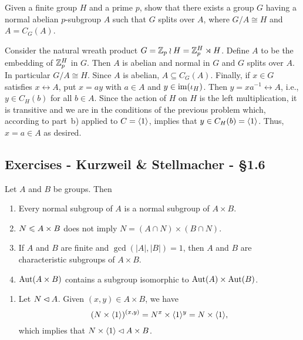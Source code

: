 \begin{solution}
\begin{probl}
    Given a finite group\/ $H$ and a prime\/ $p$, show that there exists a group\/ $G$ having a normal abelian\/ $p$-subgroup\/ $A$ such that\/ $G$ splits over\/ $A$, where\/ $G/A \cong H$ and\/ $A = C_G(A)$.
\end{probl}

\begin{solution} Consider the natural wreath product $G=\mathbb{Z}_p\wr H=\mathbb{Z}_p^H\rtimes H$. Define $A$ to be the embedding of $\mathbb{Z}_p^H$ in $G$. Then $A$ is abelian and normal in $G$ and $G$ splits over $A$. In particular $G/A\cong H$. Since $A$ is abelian, $A\subseteq C_G(A)$. Finally, if $x\in G$ satisfies $x\leftrightarrow A$, put $x=ay$ with $a\in A$ and $y\in\operatorname{im}(\iota_H)$. Then $y=xa^{-1}\leftrightarrow A$, i.e., $y\in C_H(b)$ for all $b\in A$. Since the action of $H$ on $H$ is the left multiplication, it is transitive and we are in the conditions of the previous problem which, according to part~b) applied to $C=\langle1\rangle$, implies that $y\in C_H(b)=\langle1\rangle$. Thus, $x=a\in A$ as desired.  \end{solution}

\subsection{Exercises - Kurzweil \& Stellmacher - \S 1.6}

\begin{exr}Let\/ $A$ and $B$ be groups. Then
    \begin{enumerate}[\rm a)]
    \item Every normal subgroup of\/ $A$ is a normal subgroup of\/ $A \times B$.
    \item $N \leqslant A \times B$ does not imply\/ $N = (A \cap N) \times (B \cap N)$.
    \item If\/ $A$ and\/ $B$ are finite and\/ $\gcd(|A|, |B|) = 1$, then\/ $A$ and\/ $B$ are characteristic subgroups of\/ $A \times B$.
    \item ${\rm Aut}(A \times B)$ contains a subgroup isomorphic to\/ ${\rm Aut}(A) \times {\rm Aut}(B)$.
    \end{enumerate}
\end{exr}

\begin{solution}

\begin{enumerate}[\rm a)]
    \item Let $N\lhd A$. Given $(x,y)\in A\times B$, we have
    $$
        (N\times\langle1\rangle)^{(x,y)}=N^x\times\langle1\rangle^y = N\times\langle1\rangle,
    $$
    which implies that $N\times\langle1\rangle\lhd A\times B$.


\end{enumerate}
\end{solution}
\end{solution}
